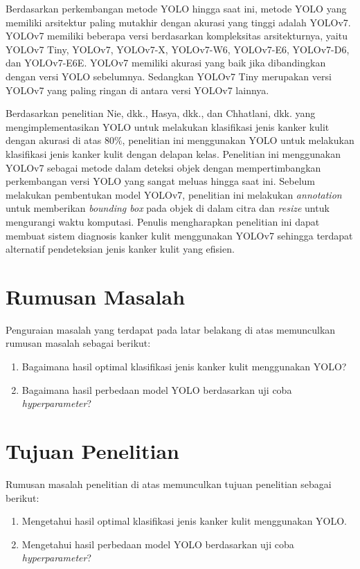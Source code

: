     Berdasarkan perkembangan metode YOLO hingga saat ini, metode YOLO yang memiliki arsitektur paling mutakhir dengan akurasi yang tinggi adalah YOLOv7. YOLOv7 memiliki beberapa versi berdasarkan kompleksitas arsitekturnya, yaitu YOLOv7 Tiny, YOLOv7, YOLOv7-X, YOLOv7-W6, YOLOv7-E6, YOLOv7-D6, dan YOLOv7-E6E. YOLOv7 memiliki akurasi yang baik jika dibandingkan dengan versi YOLO sebelumnya. Sedangkan YOLOv7 Tiny merupakan versi YOLOv7 yang paling ringan di antara versi YOLOv7 lainnya.

    Berdasarkan penelitian Nie, dkk., Hasya, dkk., dan Chhatlani, dkk. yang mengimplementasikan YOLO untuk melakukan klasifikasi jenis kanker kulit dengan akurasi di atas $80\%$, penelitian ini menggunakan YOLO untuk melakukan klasifikasi jenis kanker kulit dengan delapan kelas. Penelitian ini menggunakan YOLOv7 sebagai metode dalam deteksi objek dengan mempertimbangkan perkembangan versi YOLO yang sangat meluas hingga saat ini. Sebelum melakukan pembentukan model YOLOv7, penelitian ini melakukan \textit{annotation} untuk memberikan \textit{bounding box} pada objek di dalam citra dan \textit{resize} untuk mengurangi waktu komputasi. Penulis mengharapkan penelitian ini dapat membuat sistem diagnosis kanker kulit menggunakan YOLOv7 sehingga terdapat alternatif pendeteksian jenis kanker kulit yang efisien.

    \section{Rumusan Masalah}
    Penguraian masalah yang terdapat pada latar belakang di atas memunculkan rumusan masalah sebagai berikut:
    \begin{enumerate}
        \item Bagaimana hasil optimal klasifikasi jenis kanker kulit menggunakan YOLO?
        \item Bagaimana hasil perbedaan model YOLO berdasarkan uji coba \textit{hyperparameter}?
    \end{enumerate}

    \section{Tujuan Penelitian}
    Rumusan masalah penelitian di atas memunculkan tujuan penelitian sebagai berikut:
    \begin{enumerate}
        \item Mengetahui hasil optimal klasifikasi jenis kanker kulit menggunakan YOLO.
        \item Mengetahui hasil perbedaan model YOLO berdasarkan uji coba \textit{hyperparameter}?
    \end{enumerate}

